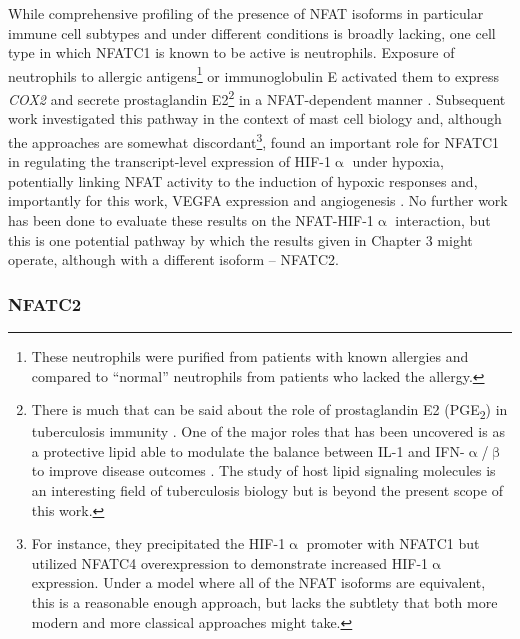 While comprehensive profiling of the presence of NFAT isoforms in particular immune cell subtypes and under different conditions is broadly lacking, one cell type in which NFATC1 is known to be active is neutrophils. Exposure of neutrophils to allergic antigens\footnote{These neutrophils were purified from patients with known allergies and compared to ``normal'' neutrophils from patients who lacked the allergy.} or immunoglobulin E activated them to express \textit{COX2} and secrete prostaglandin E2\footnote{There is much that can be said about the role of prostaglandin E2 (PGE\textsubscript{2}) in tuberculosis immunity \citep{Serhan2008}. One of the major roles that has been uncovered is as a protective lipid able to modulate the balance between IL-1 and IFN-$\upalpha$/$\upbeta$ to improve disease outcomes \citep{MayerBarber2014}. The study of host lipid signaling molecules is an interesting field of tuberculosis biology but is beyond the present scope of this work.} in a NFAT\hyp{}dependent manner \citep{Vega2007}. Subsequent work investigated this pathway in the context of mast cell biology and, although the approaches are somewhat discordant\footnote{For instance, they precipitated the HIF\hyp{}1$\upalpha$ promoter with NFATC1 but utilized NFATC4 overexpression to demonstrate increased HIF\hyp{}1$\upalpha$ expression. Under a model where all of the NFAT isoforms are equivalent, this is a reasonable enough approach, but lacks the subtlety that both more modern and more classical approaches might take.}, found an important role for NFATC1 in regulating the transcript\hyp{}level expression of HIF\hyp{}1$\upalpha$ under hypoxia, potentially linking NFAT activity to the induction of hypoxic responses and, importantly for this work, VEGFA expression and angiogenesis \citep{WalczakDrzewiecka2008}. No further work has been done to evaluate these results on the NFAT\hyp{}HIF\hyp{}1$\upalpha$ interaction, but this is one potential pathway by which the results given in Chapter 3 might operate, although with a different isoform -- NFATC2.

\subsubsection{NFATC2}\label{nfatc2}

